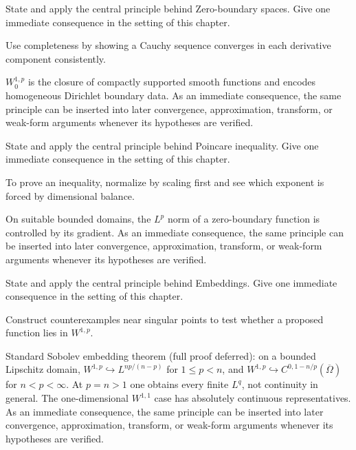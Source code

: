 \begin{exercise}\label{exr:iii21-05}
State and apply the central principle behind Zero-boundary spaces. Give one immediate consequence in the setting of this chapter.
\end{exercise}
\begin{hint}
Use completeness by showing a Cauchy sequence converges in each derivative component consistently.
\end{hint}
\begin{solution}
$W_0^{1,p}$ is the closure of compactly supported smooth functions and encodes homogeneous Dirichlet boundary data. As an immediate consequence, the same principle can be inserted into later convergence, approximation, transform, or weak-form arguments whenever its hypotheses are verified.
\end{solution}

\begin{exercise}\label{exr:iii21-06}
State and apply the central principle behind Poincare inequality. Give one immediate consequence in the setting of this chapter.
\end{exercise}
\begin{hint}
To prove an inequality, normalize by scaling first and see which exponent is forced by dimensional balance.
\end{hint}
\begin{solution}
On suitable bounded domains, the $L^p$ norm of a zero-boundary function is controlled by its gradient. As an immediate consequence, the same principle can be inserted into later convergence, approximation, transform, or weak-form arguments whenever its hypotheses are verified.
\end{solution}

\begin{exercise}\label{exr:iii21-07}
State and apply the central principle behind Embeddings. Give one immediate consequence in the setting of this chapter.
\end{exercise}
\begin{hint}
Construct counterexamples near singular points to test whether a proposed function lies in \(W^{1,p}\).
\end{hint}
\begin{solution}
Standard Sobolev embedding theorem (full proof deferred): on a bounded Lipschitz domain, $W^{1,p}\hookrightarrow L^{np/(n-p)}$ for $1\le p<n$, and $W^{1,p}\hookrightarrow C^{0,1-n/p}(\overline\Omega)$ for $n<p<\infty$. At $p=n>1$ one obtains every finite $L^q$, not continuity in general. The one-dimensional $W^{1,1}$ case has absolutely continuous representatives. As an immediate consequence, the same principle can be inserted into later convergence, approximation, transform, or weak-form arguments whenever its hypotheses are verified.
\end{solution}

